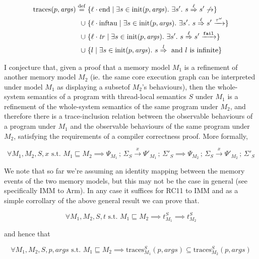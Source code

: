 \begin{align*}
\mathrm{traces}(p, \mathit{args}) \overset{\mathrm{def}}{=}\;
  & \{\ell \cdot \mathrm{end} \mid \exists s \in \mathrm{init}(p, \mathit{args}).\ \exists s'.\ s \overset{\ell}{\Rightarrow} s' \not\to \} \\
\cup\; & \{\ell \cdot \mathrm{inftau} \mid \exists s \in \mathrm{init}(p, \mathit{args}).\ \exists s'.\ s \overset{\ell}{\Rightarrow} s' \xrightarrow{\tau^{\omega}} \} \\
\cup\; & \{\ell \cdot \mathit{tr} \mid \exists s \in \mathrm{init}(p, \mathit{args}).\ \exists s'.\ s \overset{\ell}{\Rightarrow} s' \xrightarrow{\texttt{fail}} \} \\
\cup\; & \{l \mid \exists s \in \mathrm{init}(p, \mathit{args}).\ s \overset{l}{\Rightarrow} \text{ and } l \text{ is infinite} \}
\end{align*}


I conjecture that, given a proof that a memory model \(M_1\) is a refinement of another memory model \(M_2\) (ie. the same core execution graph can be interpreted under model \(M_1\) as displaying a subsetof \(M_2\)'s behaviours), then the whole-system semantics of a program with thread-local semantics \(S\) under \(M_1\) is a refinement of the whole-system semantics of the same program under \(M_2\), 
and therefore there is a trace-inclusion relation between the observable behaviours of a program under \(M_1\) and the observable behaviours of the same program under \(M_2\), satisfying the requirements of a compiler correctness proof. 
More formally, 

\[
   \forall M_1, M_2, S, x \text{ s.t. } M_1 \sqsubseteq M_2 \implies \Psi_{M_1}\, ; \, \Sigma_{S} \xrightarrow{x} \Psi'_{M_1}  \, ; \, \Sigma'_{S}  \implies \Psi_{M_2}\, ; \, \Sigma_{S} \xrightarrow{x} \Psi'_{M_2} \, ; \, \Sigma'_{S}  
\]

We note that so far we're assuming an identity mapping between the memory events of the two memory models, but this may not be the case in general (see specifically IMM to Arm). 
In any case it suffices for RC11 to IMM and as a simple corrollary of the above general result we can prove that. 

\[
    \forall M_1, M_2, S, t \text{ s.t. }  M_1 \sqsubseteq M_2 \implies t^{S}_{M_1} \implies t^{S}_{M_2} 
\]

and hence that  

\[
    \forall M_1, M_2, S, p, args \text{ s.t. }  M_1 \sqsubseteq M_2 \implies \mathrm{traces}^{S}_{M_1}(p, args) \subseteq \mathrm{traces}^{S}_{M_2}(p, args)
\]

